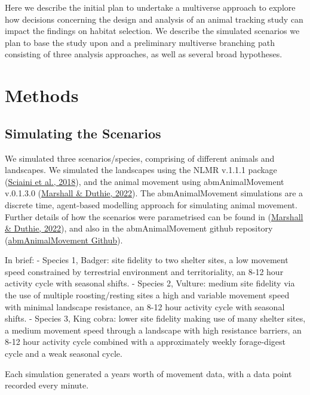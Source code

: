 \documentclass[10pt,a4paper]{article}
\begin{document}
Here we describe the initial plan to undertake a multiverse approach to explore how decisions concerning the design and analysis of an animal tracking study can impact the findings on habitat selection.
We describe the simulated scenarios we plan to base the study upon and a preliminary multiverse branching path consisting of three analysis approaches, as well as several broad hypotheses.

\hypertarget{methods}{%
\section{Methods}\label{methods}}

\hypertarget{simulating-the-scenarios}{%
\subsection{Simulating the Scenarios}\label{simulating-the-scenarios}}

We simulated three scenarios/species, comprising of different animals and landscapes.
We simulated the landscapes using the NLMR v.1.1.1 package (\protect\hyperlink{ref-NLMR}{Sciaini et al., 2018}), and the animal movement using abmAnimalMovement v.0.1.3.0 (\protect\hyperlink{ref-abmAnimalMovement}{Marshall \& Duthie, 2022}).
The abmAnimalMovement simulations are a discrete time, agent-based modelling approach for simulating animal movement.
Further details of how the scenarios were parametrised can be found in (\protect\hyperlink{ref-abmAnimalMovement}{Marshall \& Duthie, 2022}), and also in the abmAnimalMovement github repository (\href{https://github.com/BenMMarshall/abmAnimalMovement/tree/main/notebook/manuscript}{abmAnimalMovement Github}).

In brief:
- Species 1, Badger: site fidelity to two shelter sites, a low movement speed constrained by terrestrial environment and territoriality, an 8-12 hour activity cycle with seasonal shifts.
- Species 2, Vulture: medium site fidelity via the use of multiple roosting/resting sites a high and variable movement speed with minimal landscape resistance, an 8-12 hour activity cycle with seasonal shifts.
- Species 3, King cobra: lower site fidelity making use of many shelter sites, a medium movement speed through a landscape with high resistance barriers, an 8-12 hour activity cycle combined with a approximately weekly forage-digest cycle and a weak seasonal cycle.

Each simulation generated a years worth of movement data, with a data point recorded every minute.
\end{document}
